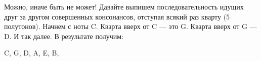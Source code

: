 Можно, иначе быть не может! Давайте выпишем последовательность идущих друг за другом совершенных консонансов, отступая всякий раз кварту (5 полутонов). Начнем с ноты C. Кварта вверх от C --- это G. Кварта вверх от G --- D. И так далее. В результате получим:
\begin{center}
    C, G, D, A, E, B, 
\end{center}
